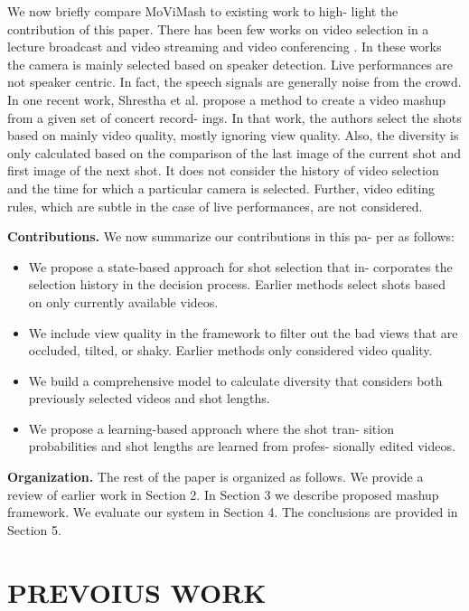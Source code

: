 \documentclass{new}
\begin{document}
We now briefly compare MoViMash to existing work to high-
light the contribution of this paper. There has been few works on
video selection in a lecture broadcast and video streaming \cite{21} \cite{6}
and video conferencing \cite{3}. In these works the camera is mainly
selected based on speaker detection. Live performances are not
speaker centric. In fact, the speech signals are generally noise from
the crowd. In one recent work, Shrestha et al. \cite{15} propose a
method to create a video mashup from a given set of concert record-
ings. In that work, the authors select the shots based on mainly
video quality, mostly ignoring view quality. Also, the diversity is
only calculated based on the comparison of the last image of the
current shot and first image of the next shot. It does not consider
the history of video selection and the time for which a particular
camera is selected. Further, video editing rules, which are subtle in
the case of live performances, are not considered.

\textbf{Contributions.} We now summarize our contributions in this pa-
per as follows:

\begin{itemize}
\item{We propose a state-based approach for shot selection that in-
corporates the selection history in the decision process. Earlier methods select shots based on only currently available
videos.}
\item We include view quality in the framework to filter out the
bad views that are occluded, tilted, or shaky. Earlier methods
only considered video quality.
\item We build a comprehensive model to calculate diversity that
considers both previously selected videos and shot lengths.

\item We propose a learning-based approach where the shot tran-
sition probabilities and shot lengths are learned from profes-
sionally edited videos.
\end{itemize}

\textbf{Organization.} The rest of the paper is organized as follows.
We provide a review of earlier work in Section 2. In Section 3 we
describe proposed mashup framework. We evaluate our system in
Section 4. The conclusions are provided in Section 5.

\section{PREVOIUS WORK}
\end{document}
